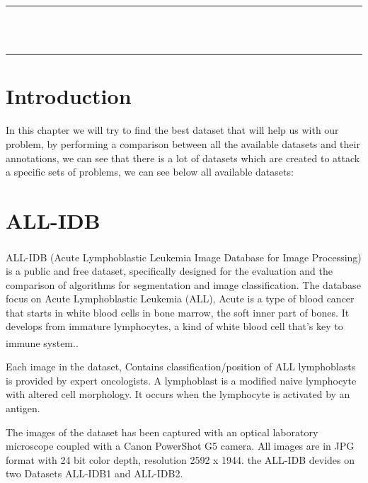 \vspace*{\fill}
\begin{center}
    {\color{Black} \rule{\linewidth}{1.2mm} }\\
\vspace{0.25in}
    {\centering{}}
\vspace{0.35in}\\
    {\color{Black} \rule{\linewidth}{1.2mm} }
\end{center}
\vspace*{\fill}
\setcounter{section}{0}

\newpage

\section{Introduction}
\hspace{\parindent}
In this chapter we will try to find the best dataset that will help us with our problem, by performing a comparison between all the available datasets and their annotations, we can see that there is a lot of datasets which are created to attack a specific sets of problems, we can see below all available datasets:

\section{ALL-IDB}
\hspace{\parindent}
ALL-IDB (Acute Lymphoblastic Leukemia Image Database for Image Processing) \textsuperscript{\cite{labati2011all}} is a public and free dataset, specifically designed for the evaluation and the comparison of algorithms for segmentation and image classification. The database focus on Acute Lymphoblastic Leukemia (ALL), Acute is a type of blood cancer that starts in white blood cells in bone marrow, the soft inner part of bones. It develops from immature lymphocytes, a kind of white blood cell that’s key to immune system.\textsuperscript{\cite{Annie_Stuart_What_2022_webmd}}.\

Each image in the dataset, Contains classification/position of ALL lymphoblasts is provided by expert oncologists. A lymphoblast is a modified naive lymphocyte with altered cell morphology. It occurs when the lymphocyte is activated by an antigen.\

The images of the dataset has been captured with an optical laboratory microscope coupled with a Canon PowerShot G5 camera. All images are in JPG format with 24 bit color depth, resolution 2592 x 1944. the ALL-IDB devides on two Datasets ALL-IDB1 and ALL-IDB2.\

